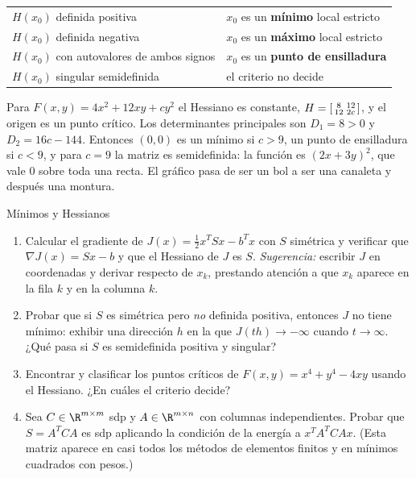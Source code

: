 \begin{center}
\begin{tabular}{ll}
\hline
$H(x_0)$ definida positiva & $x_0$ es un \textbf{mínimo} local estricto\\
$H(x_0)$ definida negativa & $x_0$ es un \textbf{máximo} local estricto\\
$H(x_0)$ con autovalores de ambos signos & $x_0$ es un \textbf{punto de ensilladura}\\
$H(x_0)$ singular semidefinida & el criterio no decide\\
\hline
\end{tabular}
\end{center}

\begin{example}
Para $F(x,y) = 4x^2+12xy+cy^2$ el Hessiano es constante,
$H = \begin{bsmallmatrix} 8 & 12\\ 12 & 2c\end{bsmallmatrix}$, y el origen es
un punto crítico. Los determinantes principales son $D_1=8>0$ y
$D_2=16c-144$. Entonces $(0,0)$ es un mínimo si $c>9$, un punto de
ensilladura si $c<9$, y para $c=9$ la matriz es semidefinida: la función es
$(2x+3y)^2$, que vale $0$ sobre toda una recta. El gráfico pasa de ser un bol
a ser una canaleta y después una montura.
\end{example}

\begin{entrega}{Mínimos y Hessianos}
\label{ent:minimos}
\begin{enumerate}[label=\textbf{(\alph*)},itemsep=3pt,topsep=4pt]
\item Calcular el gradiente de $J(x)=\frac12x^TSx-b^Tx$ con $S$ simétrica y
verificar que $\nabla J(x) = Sx-b$ y que el Hessiano de $J$ es $S$.
\emph{Sugerencia:} escribir $J$ en coordenadas y derivar respecto de $x_k$,
prestando atención a que $x_k$ aparece en la fila $k$ y en la columna $k$.

\item Probar que si $S$ es simétrica pero \emph{no} definida positiva,
entonces $J$ no tiene mínimo: exhibir una dirección $h$ en la que
$J(th)\to-\infty$ cuando $t\to\infty$. ¿Qué pasa si $S$ es semidefinida
positiva y singular?

\item Encontrar y clasificar los puntos críticos de
$F(x,y) = x^4+y^4-4xy$ usando el Hessiano. ¿En cuáles el criterio decide?

\item Sea $C\in\R^{m\times m}$ sdp y $A\in\R^{m\times n}$ con columnas
independientes. Probar que $S=A^TCA$ es sdp aplicando la condición de la
energía a $x^TA^TCAx$. (Esta matriz aparece en casi todos los métodos de
elementos finitos y en mínimos cuadrados con pesos.)
\end{enumerate}

\medskip
{}
\end{entrega}

